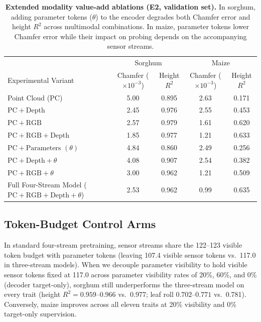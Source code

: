 \documentclass[10pt,twocolumn,letterpaper]{article}
\begin{document}
\begin{table}[t]
  \caption{\textbf{Extended modality value-add ablations (E2, validation set).} In sorghum, adding parameter tokens ($\theta$) to the encoder degrades both Chamfer error and height $R^2$ across multimodal combinations. In maize, parameter tokens lower Chamfer error while their impact on probing depends on the accompanying sensor streams.}
  \label{tab:supp-e2}
  \centering\small
  \begin{tabular}{lcccc}
  \toprule
   & \multicolumn{2}{c}{Sorghum} & \multicolumn{2}{c}{Maize} \\
  Experimental Variant & Chamfer ($\times10^{-3}$) & Height $R^2$ & Chamfer ($\times10^{-3}$) & Height $R^2$ \\
  \midrule
  Point Cloud ($\mathrm{PC}$) & 5.00 & 0.895 & 2.63 & 0.171 \\
  $\mathrm{PC} + \text{Depth}$ & 2.45 & 0.976 & 2.55 & 0.453 \\
  $\mathrm{PC} + \text{RGB}$ & 2.57 & 0.979 & 1.61 & 0.620 \\
  $\mathrm{PC} + \text{RGB} + \text{Depth}$ & 1.85 & 0.977 & 1.21 & 0.633 \\
  $\mathrm{PC} + \text{Parameters } (\theta)$ & 4.84 & 0.860 & 2.49 & 0.256 \\
  $\mathrm{PC} + \text{Depth} + \theta$ & 4.08 & 0.907 & 2.54 & 0.382 \\
  $\mathrm{PC} + \text{RGB} + \theta$ & 3.00 & 0.962 & 1.21 & 0.509 \\
  Full Four-Stream Model ($\mathrm{PC} + \text{RGB} + \text{Depth} + \theta$) & 2.53 & 0.962 & 0.99 & 0.635 \\
  \bottomrule
  \end{tabular}
\end{table}

\subsection{Token-Budget Control Arms}
In standard four-stream pretraining, sensor streams share the 122--123 visible token budget with parameter tokens (leaving 107.4 visible sensor tokens vs.\ 117.0 in three-stream models). When we decouple parameter visibility to hold visible sensor tokens fixed at 117.0 across parameter visibility rates of 20\%, 60\%, and 0\% (decoder target-only), sorghum still underperforms the three-stream model on every trait (height $R^2 = 0.959\text{--}0.966$ vs.\ 0.977; leaf roll $0.702\text{--}0.771$ vs.\ 0.781). Conversely, maize improves across all eleven traits at 20\% visibility and 0\% target-only supervision.
\end{document}
